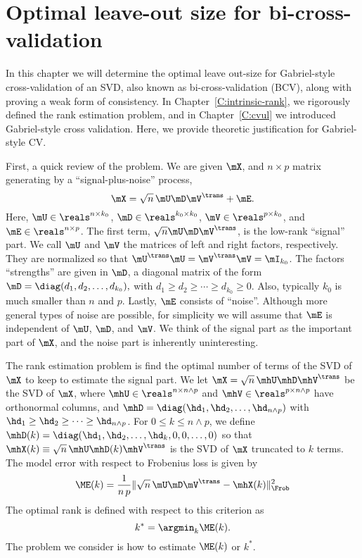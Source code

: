 \chapter[Optimal leave-out size for BCV]{Optimal leave-out size for bi-cross-validation}
\label{C:optimal-leave-out}

In this chapter we will determine the optimal leave out-size for Gabriel-style
cross-validation of an SVD, also known as bi-cross-validation (BCV), along
with proving a weak form of consistency.  In Chapter~\ref{C:intrinsic-rank},
we rigorously defined the rank estimation problem, and in 
Chapter~\ref{C:cvul} we introduced Gabriel-style cross validation.  Here, we 
provide theoretic justification for Gabriel-style CV.

First, a quick review of the problem.  We are given $\mX$, and $n \times p$ matrix generating by a ``signal-plus-noise'' process, 
\[
    \mX = \sqrt{n} \, \mU \mD \mV^\trans + \mE.
\]
Here, $\mU \in \reals^{n \times k_0}$, $\mD \in \reals^{k_0 \times k_0}$,
$\mV \in \reals^{p \times k_0}$, and $\mE \in \reals^{n \times p}$.  The first
term, $\sqrt{n} \mU \mD \mV^\trans$, is the low-rank ``signal'' part.  We call 
$\mU$ and $\mV$ the matrices of left and right factors, respectively.  They 
are normalized so that $\mU^\trans \mU = \mV^\trans \mV = \mI_{k_0}$.  The 
factors ``strengths'' are given in $\mD$, a diagonal matrix of the form
\(
    \mD =
        \diag( d_1, d_2, \ldots, d_{k_0}),
\)
with $d_1 \geq d_2 \geq \cdots \geq d_{k_0} \geq 0$.  Also, typically $k_0$ is 
much smaller than $n$ and $p$.  Lastly, $\mE$ consists of ``noise''.  Although more general types of noise are possible, for simplicity we will assume that $\mE$ is independent of $\mU$, $\mD$, and $\mV$.  We think 
of the signal part as the important part of $\mX$, and the noise part is 
inherently uninteresting.

The rank estimation problem is find the optimal number of terms of the SVD of $\mX$ to keep to estimate the signal part.  We let 
$\mX = \sqrt{n} \, \mhU \mhD \mhV^\trans$ be the SVD of $\mX$, where 
$\mhU \in \reals^{n \times n \wedge p}$ and 
$\mhV \in \reals^{p \times n \wedge p}$ have orthonormal columns, and
\(
    \mhD = \diag(
        \hd_1, \hd_2, \ldots, \hd_{n \wedge p}
    )
\)
with $\hd_1 \geq \hd_2 \geq \cdots \geq \hd_{n \wedge p}$.  For $0 \leq k \leq n \wedge p$, we define
\(
    \mhD(k) = \diag(
        \hd_1, \hd_2, \ldots, \hd_k, 0, 0, \ldots, 0
    )
\)
so that $\mhX(k) \equiv \sqrt{n} \, \mhU \mhD(k) \mhV^\trans$ is the SVD of $\mX$ truncated to $k$ terms.  The model error with respect to Frobenius loss is given by
\[
    \ME(k) = \frac{1}{n \, p}
             \| \sqrt{n} \, \mU \mD \mV^\trans - \mhX(k) \|_\Frob^2
\]
The optimal rank is defined with respect to this criterion as
\[
    k^\ast = \argmin_k \ME(k).
\]
The problem we consider is how to estimate $\ME(k)$ or $k^\ast$.

